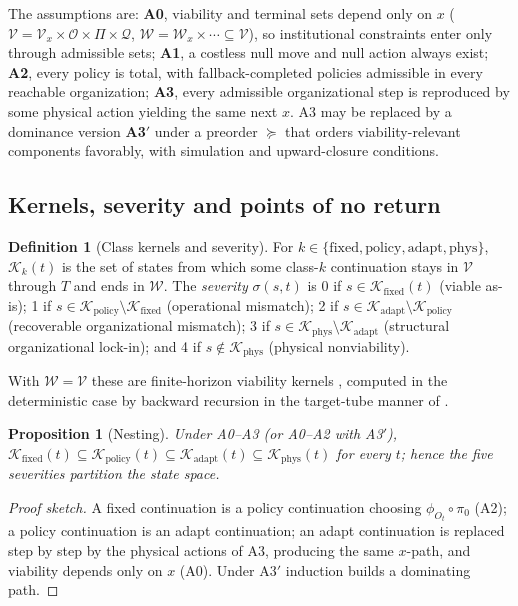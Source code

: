 \documentclass[11pt]{article}
\theoremstyle{plain}
\newtheorem{proposition}[theorem]{Proposition}
\theoremstyle{definition}
\newtheorem{definition}{Definition}
\newcommand{\K}{\mathcal{K}}
\newcommand{\V}{\mathcal{V}}
\newcommand{\W}{\mathcal{W}}
\newcommand{\fixed}{\mathrm{fixed}}
\newcommand{\policy}{\mathrm{policy}}
\newcommand{\adapt}{\mathrm{adapt}}
\newcommand{\phys}{\mathrm{phys}}
\begin{document}
The assumptions are: \textbf{A0}, viability and terminal sets depend only on $x$ ($\V=\V_x\times\mathcal O\times\Pi\times\mathcal Q$, $\W=\W_x\times\cdots\subseteq\V$), so institutional constraints enter only through admissible sets; \textbf{A1}, a costless null move and null action always exist; \textbf{A2}, every policy is total, with fallback-completed policies admissible in every reachable organization; \textbf{A3}, every admissible organizational step is reproduced by some physical action yielding the same next $x$. A3 may be replaced by a dominance version \textbf{A3$'$} under a preorder $\succeq$ that orders viability-relevant components favorably, with simulation and upward-closure conditions.

\subsection{Kernels, severity and points of no return}

\begin{definition}[Class kernels and severity]
For $k\in\{\fixed,\policy,\adapt,\phys\}$, $\K_k(t)$ is the set of states from which some class-$k$ continuation stays in $\V$ through $T$ and ends in $\W$. The \emph{severity} $\sigma(s,t)$ is 0 if $s\in\K_\fixed(t)$ (viable as-is); 1 if $s\in\K_\policy\setminus\K_\fixed$ (operational mismatch); 2 if $s\in\K_\adapt\setminus\K_\policy$ (recoverable organizational mismatch); 3 if $s\in\K_\phys\setminus\K_\adapt$ (structural organizational lock-in); and 4 if $s\notin\K_\phys$ (physical nonviability).
\end{definition}

With $\W=\V$ these are finite-horizon viability kernels \citep{Aubin1991}, computed in the deterministic case by backward recursion in the target-tube manner of \citet{BertsekasRhodes1971}.

\begin{proposition}[Nesting]\label{prop:nesting}
Under A0--A3 (or A0--A2 with A3$'$), $\K_\fixed(t)\subseteq\K_\policy(t)\subseteq\K_\adapt(t)\subseteq\K_\phys(t)$ for every $t$; hence the five severities partition the state space.
\end{proposition}
\begin{proof}[Proof sketch]
A fixed continuation is a policy continuation choosing $\phi_{O_t}\circ\pi_0$ (A2); a policy continuation is an adapt continuation; an adapt continuation is replaced step by step by the physical actions of A3, producing the same $x$-path, and viability depends only on $x$ (A0). Under A3$'$ induction builds a dominating path.
\end{proof}
\end{document}
